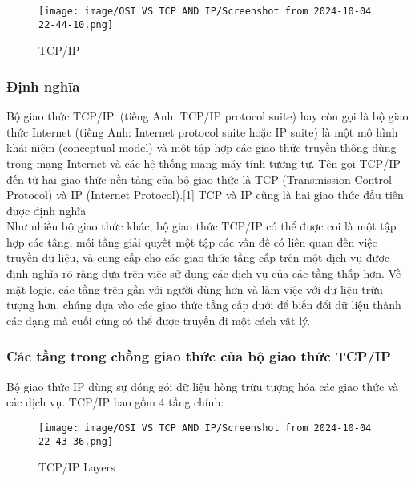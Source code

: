 \documentclass[a4paper,12pt]{article}
\begin{document}
\begin{figure}[htbp]
    \centering
    \texttt{[image: image/OSI VS TCP AND IP/Screenshot from 2024-10-04 22-44-10.png]}
    \caption{TCP/IP}
    \label{}
\end{figure}



\subsubsection{Định nghĩa}
Bộ giao thức TCP/IP, (tiếng Anh: TCP/IP protocol suite) hay còn gọi là bộ giao thức Internet (tiếng Anh: Internet protocol suite hoặc IP suite) là một mô hình khái niệm (conceptual model) và một tập hợp các giao thức truyền thông dùng trong mạng Internet và các hệ thống mạng máy tính tương tự. Tên gọi TCP/IP đến từ hai giao thức nền tảng của bộ giao thức là TCP (Transmission Control Protocol) và IP (Internet Protocol).[1] TCP và IP cũng là hai giao thức đầu tiên được định nghĩa
\\
Như nhiều bộ giao thức khác, bộ giao thức TCP/IP có thể được coi là một tập hợp các tầng, mỗi tầng giải quyết một tập các vấn đề có liên quan đến việc truyền dữ liệu, và cung cấp cho các giao thức tầng cấp trên một dịch vụ được định nghĩa rõ ràng dựa trên việc sử dụng các dịch vụ của các tầng thấp hơn. Về mặt logic, các tầng trên gần với người dùng hơn và làm việc với dữ liệu trừu tượng hơn, chúng dựa vào các giao thức tầng cấp dưới để biến đổi dữ liệu thành các dạng mà cuối cùng có thể được truyền đi một cách vật lý.
\subsubsection{Các tầng trong chồng giao thức của bộ giao thức TCP/IP}
Bộ giao thức IP dùng sự đóng gói dữ liệu hòng trừu tượng hóa các giao thức và các dịch vụ. TCP/IP bao gồm 4 tầng chính:



\begin{figure}[htbp]
    \centering
    \texttt{[image: image/OSI VS TCP AND IP/Screenshot from 2024-10-04 22-43-36.png]}
    \caption{TCP/IP Layers}
    \label{}
\end{figure}
\end{document}
